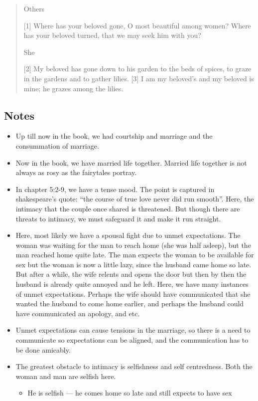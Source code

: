 \begin{quote}
    Others

    [1] Where has your beloved gone,
        O most beautiful among women?
    Where has your beloved turned,
        that we may seek him with you?


        She

    [2] My beloved has gone down to his garden
        to the beds of spices,
    to graze in the gardens
        and to gather lilies.
    [3] I am my beloved’s and my beloved is mine;
        he grazes among the lilies.
  \end{quote}
\subsection*{Notes}
\begin{itemize}
  \item{Up till now in the book, we had courtship and marriage and the consummation of marriage.}
  \item{Now in the book, we have married life together. Married life together is not always as rosy as the fairytales portray.}
  \item{In chapter 5:2-9, we have a tense mood. The point is captured in shakespeare’s quote: “the course of true love never did run smooth”. Here, the intimacy that the couple once shared is threatened. But though there are threats to intimacy, we must safeguard it and make it run straight.}
  \item{Here, most likely we have a spousal fight due to unmet expectations. The woman was waiting for the man to reach home (she was half asleep), but the man reached home quite late. The man expects the woman to be available for sex but the woman is now a little lazy, since the husband came home so late. But after a while, the wife relents and opens the door but then by then the husband is already quite annoyed and he left. Here, we have many instances of unmet expectations. Perhaps the wife should have communicated that she wanted the husband to come home earlier, and perhaps the husband could have communicated an apology, and etc. }
  \item{Unmet expectations can cause tensions in the marriage, so there is a need to communicate so expectations can be aligned, and the communication has to be done amicably.}
  \item{The greatest obstacle to intimacy is selfishness and self centredness. Both the woman and man are selfish here.
  \begin{itemize}
    \item{He is selfish --- he comes home so late and still expects to have sex}

\end{itemize}}
\end{itemize}
